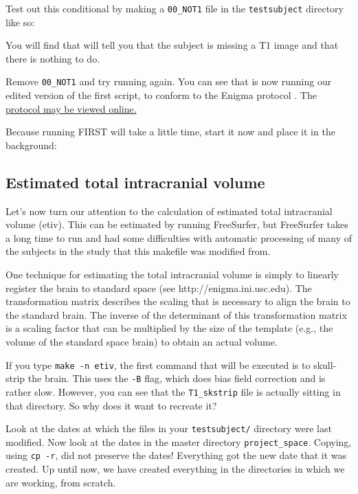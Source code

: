 Test out this conditional by making a \texttt{00_NOT1} file in the \texttt{testsubject} directory like so:

You will find that \maken{} will tell you that the subject is missing a T1 image and that there is nothing to do.

Remove \texttt{00_NOT1} and try running \maken{} again. You can see that \maken{} is now running our edited version of the first script, to conform to the Enigma protocol \citep[see][]{Stein2012}. 
The \href{http://enigma.ini.usc.edu/protocols/imaging-protocols/hippocampal-segmentation-through-first/}{protocol may be viewed online.}

Because running FIRST will take a little time, start it now and place it in the background:

\subsection{Estimated total intracranial volume}
Let's now turn our attention to the calculation of estimated total intracranial volume (etiv). This can be estimated by running FreeSurfer, but FreeSurfer takes a long time to run and had some difficulties with automatic processing of many of the subjects in the study that this makefile was modified from. 

One technique for estimating the total intracranial volume is simply
to linearly register the brain to standard space (see http://enigma.ini.usc.edu). The transformation
matrix describes the scaling that is necessary to align the brain to
the standard brain. The inverse of the determinant of this
transformation matrix is a scaling factor that can be multiplied by the size of the template (e.g., the volume of the standard space brain) to obtain an actual volume.

If you type \texttt{make -n etiv}, the first command that will be executed is to skull-strip the brain. This uses the \texttt{-B} flag, which does bias field correction and is rather slow. However, you can see that the \texttt{T1_skstrip} file is actually sitting in that directory. So why does it want to recreate it?

Look at the dates at which the files in your \texttt{testsubject/} directory were last modified. Now look at the dates in the master directory \texttt{project_space}. Copying, using \texttt{cp -r}, did not preserve the dates! Everything got the new date that it was created. Up until now, we have created everything in the directories in which we are working, from scratch. 

